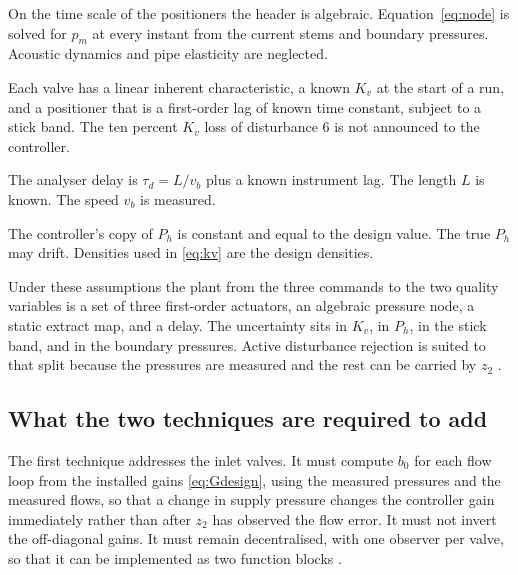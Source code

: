 \begin{assumption}
\label{as:algebraic}
On the time scale of the positioners the header is algebraic. Equation~\eqref{eq:node} is solved for $p_m$ at every instant from the current stems and boundary pressures. Acoustic dynamics and pipe elasticity are neglected.
\end{assumption}

\begin{assumption}
\label{as:linear-valve}
Each valve has a linear inherent characteristic, a known $K_v$ at the start of a run, and a positioner that is a first-order lag of known time constant, subject to a stick band. The ten percent $K_v$ loss of disturbance 6 is not announced to the controller.
\end{assumption}

\begin{assumption}
\label{as:delay-known}
The analyser delay is $\tau_d = L/v_b$ plus a known instrument lag. The length $L$ is known. The speed $v_b$ is measured.
\end{assumption}

\begin{assumption}
\label{as:ph}
The controller's copy of $P_h$ is constant and equal to the design value. The true $P_h$ may drift. Densities used in \eqref{eq:kv} are the design densities.
\end{assumption}

Under these assumptions the plant from the three commands to the two quality variables is a set of three first-order actuators, an algebraic pressure node, a static extract map, and a delay. The uncertainty sits in $K_v$, in $P_h$, in the stick band, and in the boundary pressures. Active disturbance rejection is suited to that split because the pressures are measured and the rest can be carried by $z_2$ \cite{gao2014centrality,fu2016tuning}.

\subsection{What the two techniques are required to add}

The first technique addresses the inlet valves. It must compute $b_0$ for each flow loop from the installed gains \eqref{eq:Gdesign}, using the measured pressures and the measured flows, so that a change in supply pressure changes the controller gain immediately rather than after $z_2$ has observed the flow error. It must not invert the off-diagonal gains. It must remain decentralised, with one observer per valve, so that it can be implemented as two function blocks \cite{madonski2019error,herbst2013simulative}.

